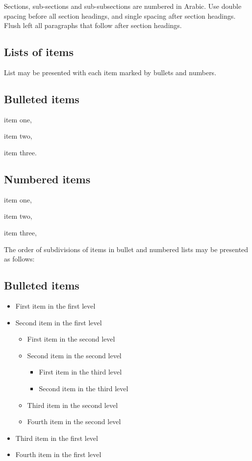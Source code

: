 \documentclass{ws-ijprai}
\begin{document}
Sections, sub-sections and sub-subsections are numbered in
Arabic.  Use double spacing before all section headings, and
single spacing after section headings. Flush left all paragraphs
that follow after section headings.

\subsection{Lists of items}

List may be presented with each item marked by bullets and numbers.

\subsection*{Bulleted items}

\begin{itemlist}
 \item item one,
 \item item two,
 \item item three.
\end{itemlist}

\subsection*{Numbered items}

\begin{arabiclist}
 \item item one,
 \item item two,
 \item item three,
\end{arabiclist}

The order of subdivisions of items in bullet and numbered lists may be
presented as follows:

\subsection*{Bulleted items}

\begin{itemize}
\item First item in the first level
\item Second item in the first level
\begin{itemize}
\item First item in the second level
\item Second item in the second level
\begin{itemize}
\item First item in the third level
\item Second item in the third level
\end{itemize}
\item Third item in the second level
\item Fourth item in the second level
\end{itemize}
\item Third item in the first level
\item Fourth item in the first level
\end{itemize}
\end{document}
